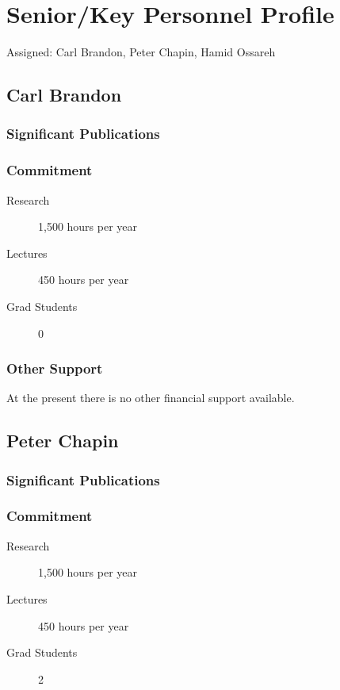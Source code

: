 \section{Senior/Key Personnel Profile}
Assigned: Carl Brandon, Peter Chapin, Hamid Ossareh
\subsection{Carl Brandon}

\subsubsection{Significant Publications}

\subsubsection{Commitment}
\begin{description}
\item[Research] 1,500 hours per year
\item[Lectures]   450 hours per year
\item[Grad Students] 0
\end{description}

\subsubsection{Other Support}
At the present there is no other financial support available.

\subsection{Peter Chapin}
%
\subsubsection{Significant Publications}

\subsubsection{Commitment}
\begin{description}
\item[Research] 1,500 hours per year
\item[Lectures]   450 hours per year
\item[Grad Students] 2
\end{description}

